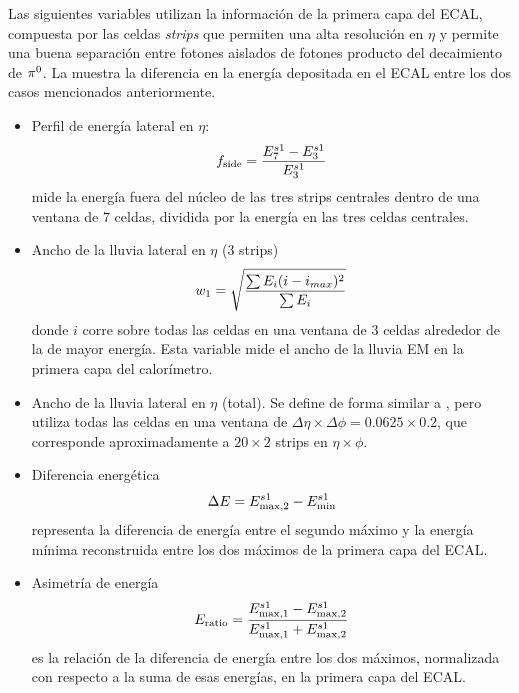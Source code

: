 Las siguientes variables utilizan la información de la primera capa del \ac{ECAL}, compuesta por las celdas \textit{strips} que permiten una alta resolución en \(\eta\) y permite una buena separación entre fotones aislados de fotones producto del decaimiento de \(\pi^{0}\). La \Fig{\ref{fig:pid_ss:ss:pizero}} muestra la diferencia en la energía depositada en el \ac{ECAL} entre los dos casos mencionados anteriormente.
\begin{itemize}
    \item Perfil de energía lateral en \(\eta\):
        \begin{equation}
            f_{\text{side}} = \frac{E_7^{s1} - E_3^{s1}}{E_3^{s1}}
        \end{equation}
        mide la energía fuera del núcleo de las tres strips centrales dentro de una ventana de 7 celdas, dividida por la energía en las tres celdas centrales.
    \item Ancho de la lluvia lateral en \(\eta\) (3 strips)
        \begin{equation}
            w_{1} = \sqrt{
                \frac{\sum E_i (i - i_{max})^2}{\sum E_i}
            }
        \end{equation}
        donde \(i\) corre sobre todas las celdas en una ventana de 3 celdas alrededor de la de mayor energía. Esta variable mide el ancho de la lluvia \ac{EM} en la primera capa del calorímetro.
    \item Ancho de la lluvia lateral en \(\eta\) (total).
        Se define de forma similar a \wone, pero utiliza todas las celdas en una ventana de \(\Delta\eta\times\Delta\phi=0.0625\times 0.2\), que corresponde aproximadamente a \(20\times 2\) strips en \(\eta\times\phi\).
    \item Diferencia energética
        \begin{equation}
            \Delta E = E_{\text{max}, 2}^{s1} - E_{\text{min}}^{s1}
        \end{equation}
        representa la diferencia de energía entre el segundo máximo y la energía mínima reconstruida entre los dos máximos de la primera capa del \ac{ECAL}.
    \item Asimetr\'ia de energía
        \begin{equation}
            E_{\text{ratio}} = \frac{
                E_{\text{max}, 1}^{s1} - E_{\text{max}, 2}^{s1}
            }{
                E_{\text{max}, 1}^{s1} + E_{\text{max}, 2}^{s1}
            }
        \end{equation}
        es la relación de la diferencia de energía entre los dos máximos, normalizada con respecto a la suma de esas energías, en la primera capa del \ac{ECAL}.
\end{itemize}

